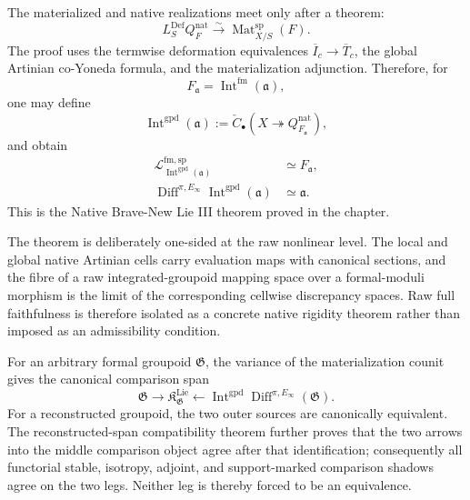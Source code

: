 The materialized and native realizations meet only after a theorem:
\[
\boxed{
    L_S^{\mathrm{Def}}Q_F^{\mathrm{nat}}
    \xrightarrow{\sim}
    \operatorname{Mat}^{\mathrm{sp}}_{X/S}(F).}
\]
The proof uses the termwise deformation equivalences
$\overline I_c\to\overline T_c$, the global Artinian co-Yoneda formula, and
the materialization adjunction.  Therefore, for
\[
    F_{\mathfrak a}
    =
    \operatorname{Int}^{\mathrm{fm}}(\mathfrak a),
\]
one may define
\[
\boxed{
    \operatorname{Int}^{\mathrm{gpd}}(\mathfrak a)
    :=
    \check C_\bullet
    \left(
      X\twoheadrightarrow Q_{F_{\mathfrak a}}^{\mathrm{nat}}
    \right),}
\]
and obtain
\[
\boxed{
\begin{aligned}
    \mathcal L^{\mathrm{fm,sp}}_{
      \operatorname{Int}^{\mathrm{gpd}}(\mathfrak a)}
    &\simeq
    F_{\mathfrak a},\\
    \operatorname{Diff}^{\pi,E_\infty}
    \operatorname{Int}^{\mathrm{gpd}}(\mathfrak a)
    &\simeq
    \mathfrak a.
\end{aligned}}
\]
This is the Native Brave-New Lie III theorem proved in the chapter.

The theorem is deliberately one-sided at the raw nonlinear level.  The local
and global native Artinian cells carry evaluation maps with canonical
sections, and the fibre of a raw integrated-groupoid mapping space over a
formal-moduli morphism is the limit of the corresponding cellwise discrepancy
spaces.  Raw full faithfulness is therefore isolated as a concrete native
rigidity theorem rather than imposed as an admissibility condition.

For an arbitrary formal groupoid $\mathfrak G$, the variance of the
materialization counit gives the canonical comparison span
\[
\boxed{
    \mathfrak G
    \longrightarrow
    \mathfrak K^{\mathrm{Lie}}_{\mathfrak G}
    \longleftarrow
    \operatorname{Int}^{\mathrm{gpd}}
    \operatorname{Diff}^{\pi,E_\infty}(\mathfrak G).}
\]
For a reconstructed groupoid, the two outer sources are canonically
equivalent.  The reconstructed-span compatibility theorem further proves that
the two arrows into the middle comparison object agree after that
identification; consequently all functorial stable, isotropy, adjoint, and
support-marked comparison shadows agree on the two legs.  Neither leg is
thereby forced to be an equivalence.

